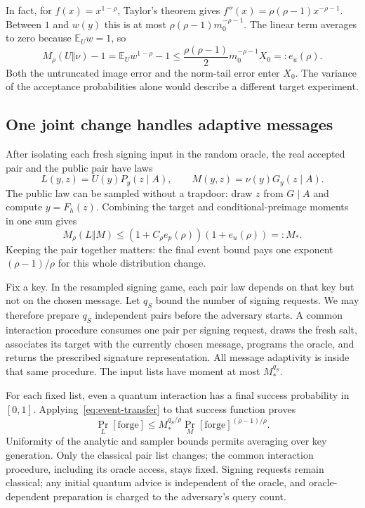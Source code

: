 \documentclass[11pt,a4paper]{article}
\newcommand{\E}{\mathbb E}
\theoremstyle{definition}
\theoremstyle{remark}
\numberwithin{equation}{section}
\begin{document}
In fact, for $f(x)=x^{1-\rho}$, Taylor's theorem gives
$f''(x)=\rho(\rho-1)x^{-\rho-1}$. Between $1$ and $w(y)$ this is at most
$\rho(\rho-1)m_0^{-\rho-1}$. The linear term averages to zero because
$\E_U w=1$, so
\begin{equation}
 M_\rho(U\Vert\nu)-1
 =\E_U w^{1-\rho}-1
 \le\frac{\rho(\rho-1)}2m_0^{-\rho-1}X_0
 =:e_u(\rho).
 \label{eq:reverse-moment-security}
\end{equation}
Both the untruncated image error and the norm-tail error enter $X_0$.
The variance of the acceptance probabilities alone would describe a
different target experiment.

\subsection{One joint change handles adaptive messages}

After isolating each fresh signing input in the random oracle, the real
accepted pair and the public pair have laws
\begin{equation}
 L(y,z)=U(y)P_y(z\mid A),\qquad
 M(y,z)=\nu(y)G_y(z\mid A).
\end{equation}
The public law can be sampled without a trapdoor: draw $z$ from $G\mid A$
and compute $y=F_h(z)$. Combining the target and conditional-preimage moments
in one sum gives
\begin{equation}
 M_\rho(L\Vert M)
 \le(1+C_\rho e_p(\rho))(1+e_u(\rho))=:M_*.
 \label{eq:joint-moment-security}
\end{equation}
Keeping the pair together matters: the final event bound pays one exponent
$(\rho-1)/\rho$ for this whole distribution change.

Fix a key. In the resampled signing game, each pair law depends on that key
but not on the chosen message. Let $q_S$ bound the number of signing requests. We may therefore prepare $q_S$ independent
pairs before the adversary starts. A common interaction procedure consumes
one pair per signing request, draws the fresh salt, associates its target
with the currently chosen message, programs the oracle, and returns the
prescribed signature representation. All message adaptivity is inside that
same procedure. The input lists have moment at most $M_*^{q_S}$.

For each fixed list, even a quantum interaction has a final success
probability in $[0,1]$. Applying~\eqref{eq:event-transfer} to that success
function proves
\begin{equation}
 \Pr_L[\mathrm{forge}]
 \le M_*^{q_S/\rho}
       \Pr_M[\mathrm{forge}]^{(\rho-1)/\rho}.
 \label{eq:adaptive-list-security}
\end{equation}
Uniformity of the analytic and sampler bounds permits averaging over key
generation. Only the classical pair list changes; the common interaction
procedure, including its oracle access, stays fixed. Signing requests remain classical; any initial quantum
advice is independent of the oracle, and oracle-dependent preparation is
charged to the adversary's query count.
\end{document}
